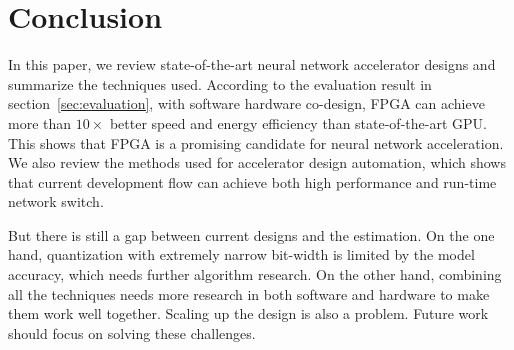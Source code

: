 \section{Conclusion}\label{sec:conclusion}

In this paper, we review state-of-the-art neural network accelerator designs and summarize the techniques used. According to the evaluation result in section~\ref{sec:evaluation}, with software hardware co-design, FPGA can achieve more than $10\times$ better speed and energy efficiency than state-of-the-art GPU. This shows that FPGA is a promising candidate for neural network acceleration. We also review the methods used for accelerator design automation, which shows that current development flow can achieve both high performance and run-time network switch.

But there is still a gap between current designs and the estimation. On the one hand, quantization with extremely narrow bit-width is limited by the model accuracy, which needs further algorithm research. On the other hand, combining all the techniques needs more research in both software and hardware to make them work well together.  Scaling up the design is also a problem. Future work should focus on solving these challenges. 